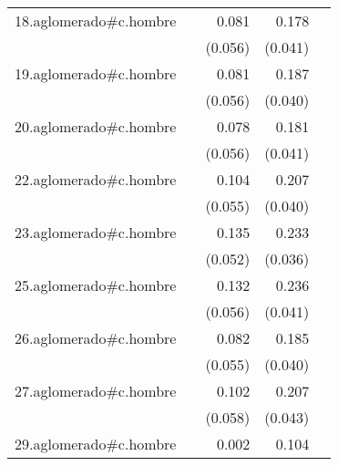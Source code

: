 {\begin{longtable}{l*{4}{D{.}{.}{-1}}}
\addlinespace
18.aglomerado#c.hombre&                     &       0.081         &       0.178\sym{***}&                     \\
            &                     &     (0.056)         &     (0.041)         &                     \\
\addlinespace
19.aglomerado#c.hombre&                     &       0.081         &       0.187\sym{***}&                     \\
            &                     &     (0.056)         &     (0.040)         &                     \\
\addlinespace
20.aglomerado#c.hombre&                     &       0.078         &       0.181\sym{***}&                     \\
            &                     &     (0.056)         &     (0.041)         &                     \\
\addlinespace
22.aglomerado#c.hombre&                     &       0.104         &       0.207\sym{***}&                     \\
            &                     &     (0.055)         &     (0.040)         &                     \\
\addlinespace
23.aglomerado#c.hombre&                     &       0.135\sym{*}  &       0.233\sym{***}&                     \\
            &                     &     (0.052)         &     (0.036)         &                     \\
\addlinespace
25.aglomerado#c.hombre&                     &       0.132\sym{*}  &       0.236\sym{***}&                     \\
            &                     &     (0.056)         &     (0.041)         &                     \\
\addlinespace
26.aglomerado#c.hombre&                     &       0.082         &       0.185\sym{***}&                     \\
            &                     &     (0.055)         &     (0.040)         &                     \\
\addlinespace
27.aglomerado#c.hombre&                     &       0.102         &       0.207\sym{***}&                     \\
            &                     &     (0.058)         &     (0.043)         &                     \\
\addlinespace
29.aglomerado#c.hombre&                     &       0.002         &       0.104\sym{**} &                     \\

\end{longtable}}
